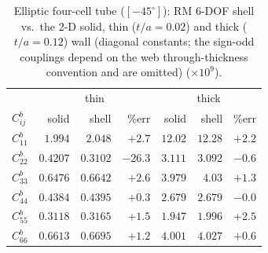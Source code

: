 \begin{table}[htpb]
\centering
\small
\caption{Elliptic four-cell tube ($[-45^\circ]$): RM 6-DOF shell vs.\ the 2-D solid, thin ($t/a=0.02$) and thick ($t/a=0.12$) wall (diagonal constants; the sign-odd couplings depend on the web through-thickness convention and are omitted) ($\times10^{9}$).}
\label{tab:ellm45}
\setlength{\tabcolsep}{4.5pt}
\begin{tabular}{l|rrr|rrr}
\hline
 & \multicolumn{3}{c|}{thin} & \multicolumn{3}{c}{thick} \\
$C^{b}_{ij}$ & solid & shell & \%err & solid & shell & \%err \\
\hline
$C^{b}_{11}$ & $1.994$ & $2.048$ & $+2.7$ & $12.02$ & $12.28$ & $+2.2$ \\
$C^{b}_{22}$ & $0.4207$ & $0.3102$ & $-26.3$ & $3.111$ & $3.092$ & $-0.6$ \\
$C^{b}_{33}$ & $0.6476$ & $0.6642$ & $+2.6$ & $3.979$ & $4.03$ & $+1.3$ \\
$C^{b}_{44}$ & $0.4384$ & $0.4395$ & $+0.3$ & $2.679$ & $2.679$ & $-0.0$ \\
$C^{b}_{55}$ & $0.3118$ & $0.3165$ & $+1.5$ & $1.947$ & $1.996$ & $+2.5$ \\
$C^{b}_{66}$ & $0.6613$ & $0.6695$ & $+1.2$ & $4.001$ & $4.027$ & $+0.6$ \\
\hline
\end{tabular}
\end{table}